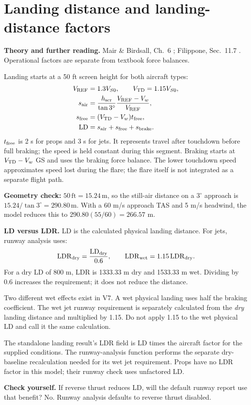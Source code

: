 \documentclass[11pt,letterpaper]{article}
\newcommand{\unit}[1]{\,\mathrm{#1}}
\newcommand{\topic}[1]{\clearpage\section{#1}}
\newcommand{\reading}[1]{{\small\color{navy}\textbf{Theory and further reading.} #1\par}\vspace{3pt}}
\newcommand{\selfcheck}[1]{\par\textbf{Check yourself.} #1\par}
\begin{document}
\topic{Landing distance and landing-distance factors}
\reading{Mair \& Birdsall, Ch.~6 \cite{mair}; Filippone, Sec.~11.7 \cite{filippone}. Operational factors are separate from textbook force balances.}
Landing starts at a 50 ft screen height for both aircraft types:
\begin{align*}
V_{\rm REF}&=1.3V_{S0},\qquad V_{\rm TD}=1.15V_{S0},\\
s_{\rm air}&=\frac{h_{\rm scr}}{\tan3^\circ}
\frac{V_{\rm REF}-V_w}{V_{\rm REF}},\\
s_{\rm free}&=(V_{\rm TD}-V_w)t_{\rm free},\\
\mathrm{LD}&=s_{\rm air}+s_{\rm free}+s_{\rm brake}.
\end{align*}
$t_{\rm free}$ is 2 s for props and 3 s for jets. It represents travel after
touchdown before full braking; the speed is held constant during this segment.
Braking starts at $V_{\rm TD}-V_w$ GS and uses the braking force balance.
The lower touchdown speed approximates speed lost during the flare; the flare
itself is not integrated as a separate flight path.

\textbf{Geometry check:} $50\unit{ft}=15.24\unit m$, so the still-air distance
on a $3^\circ$ approach is $15.24/\tan3^\circ=290.80\unit m$.
With a 60 m/s approach TAS and 5 m/s headwind, the model reduces this to
$290.80(55/60)=266.57$ m.

\textbf{LD versus LDR.} LD is the calculated physical landing distance.
For jets, runway analysis uses:
\[
\mathrm{LDR}_{\rm dry}=\frac{\mathrm{LD}_{\rm dry}}{0.6},\qquad
\mathrm{LDR}_{\rm wet}=1.15\,\mathrm{LDR}_{\rm dry}.
\]
For a dry LD of 800 m, LDR is 1333.33 m dry and 1533.33 m wet.
Dividing by 0.6 increases the requirement; it does not reduce the distance.

\begin{keyidea}
Two different wet effects exist in V7. A wet physical landing uses half the
braking coefficient. The wet jet runway requirement is separately calculated
from the \emph{dry} landing distance and multiplied by 1.15.
Do not apply 1.15 to the wet physical LD and call it the same calculation.
\end{keyidea}
The standalone landing result's LDR field is LD times the aircraft factor for
the supplied conditions. The runway-analysis function performs the separate
dry-baseline recalculation needed for its wet jet requirement. Props have no
LDR factor in this model; their runway check uses unfactored LD.
\selfcheck{If reverse thrust reduces LD, will the default runway report use that
benefit? No. Runway analysis defaults to reverse thrust disabled.}
\end{document}
